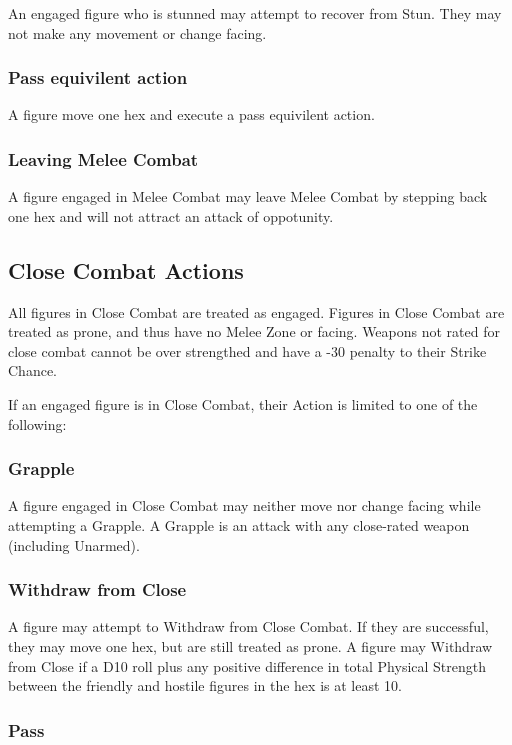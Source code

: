 \begin{multicols*}{3}
An engaged figure who is stunned may attempt to recover from Stun.
They may not make any movement or change facing.

\subsubsection{Pass equivilent action}

A figure move one hex and execute a pass equivilent action.

\subsubsection{Leaving Melee Combat}

A figure engaged in Melee Combat may leave Melee Combat by stepping
back one hex and will not attract an attack of oppotunity.

\subsection{Close Combat Actions}
\label{combat:close}

All figures in Close Combat are treated as engaged.  Figures in Close
Combat are treated as prone, and thus have no Melee Zone or facing.
Weapons not rated for close combat cannot be over strengthed and have
a -30 penalty to their Strike Chance.

If an engaged figure is in Close Combat, their Action is limited to
one of the following:

\subsubsection{Grapple}

A figure engaged in Close Combat may neither move nor change facing
while attempting a Grapple. A Grapple is an attack with any
close-rated weapon (including Unarmed).

\subsubsection{Withdraw from Close}

A figure may attempt to Withdraw from Close Combat. If they are
successful, they may move one hex, but are still treated as prone. A
figure may Withdraw from Close if a D10 roll plus any positive
difference in total Physical Strength between the friendly and hostile
figures in the hex is at least 10.

\subsubsection{Pass}


\end{multicols*}
